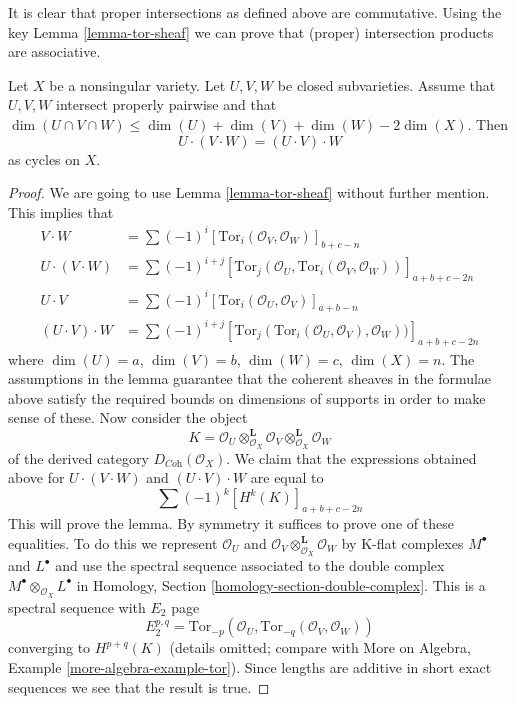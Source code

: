 \noindent
It is clear that proper intersections as defined above are commutative.
Using the key Lemma \ref{lemma-tor-sheaf} we can prove that (proper)
intersection products are associative.

\begin{lemma}
\label{lemma-associative}
Let $X$ be a nonsingular variety. Let $U, V, W$ be closed
subvarieties. Assume that $U, V, W$ intersect properly pairwise
and that $\dim(U \cap V \cap W) \leq \dim(U) + \dim(V) + \dim(W) - 2\dim(X)$.
Then
$$
U \cdot (V \cdot W) = (U \cdot V) \cdot W
$$
as cycles on $X$.
\end{lemma}

\begin{proof}
We are going to use Lemma \ref{lemma-tor-sheaf} without further mention.
This implies that
\begin{align*}
V \cdot W
& =
\sum (-1)^i [\text{Tor}_i(\mathcal{O}_V, \mathcal{O}_W)]_{b + c - n} \\
U \cdot (V \cdot W)
& =
\sum (-1)^{i + j}
[
\text{Tor}_j(\mathcal{O}_U, \text{Tor}_i(\mathcal{O}_V, \mathcal{O}_W))
]_{a + b + c - 2n} \\
U \cdot V
& =
\sum (-1)^i [\text{Tor}_i(\mathcal{O}_U, \mathcal{O}_V)]_{a + b - n} \\
(U \cdot V) \cdot W
& =
\sum (-1)^{i + j}
[
\text{Tor}_j(\text{Tor}_i(\mathcal{O}_U, \mathcal{O}_V), \mathcal{O}_W))
]_{a + b + c - 2n}
\end{align*}
where $\dim(U) = a$, $\dim(V) = b$, $\dim(W) = c$, $\dim(X) = n$.
The assumptions in the lemma guarantee that the coherent sheaves
in the formulae above satisfy the required bounds on dimensions
of supports in order to make sense of these. Now consider the object
$$
K =
\mathcal{O}_U \otimes^\mathbf{L}_{\mathcal{O}_X} \mathcal{O}_V
\otimes^\mathbf{L}_{\mathcal{O}_X} \mathcal{O}_W
$$
of the derived category $D_{\textit{Coh}}(\mathcal{O}_X)$.
We claim that the expressions obtained above for
$U \cdot (V \cdot W)$ and $(U \cdot V) \cdot W$
are equal to
$$
\sum (-1)^k [H^k(K)]_{a + b + c - 2n}
$$
This will prove the lemma. By symmetry it suffices to prove one
of these equalities. To do this we represent $\mathcal{O}_U$
and $\mathcal{O}_V \otimes_{\mathcal{O}_X}^\mathbf{L} \mathcal{O}_W$
by K-flat complexes $M^\bullet$ and $L^\bullet$ and use the
spectral sequence associated to the double complex
$M^\bullet \otimes_{\mathcal{O}_X} L^\bullet$ in
Homology, Section \ref{homology-section-double-complex}.
This is a spectral sequence with $E_2$ page
$$
E_2^{p, q} =
\text{Tor}_{-p}(\mathcal{O}_U, \text{Tor}_{-q}(\mathcal{O}_V, \mathcal{O}_W))
$$
converging to $H^{p + q}(K)$ (details omitted; compare with
More on Algebra, Example \ref{more-algebra-example-tor}).
Since lengths are additive in short
exact sequences we see that the result is true.
\end{proof}




